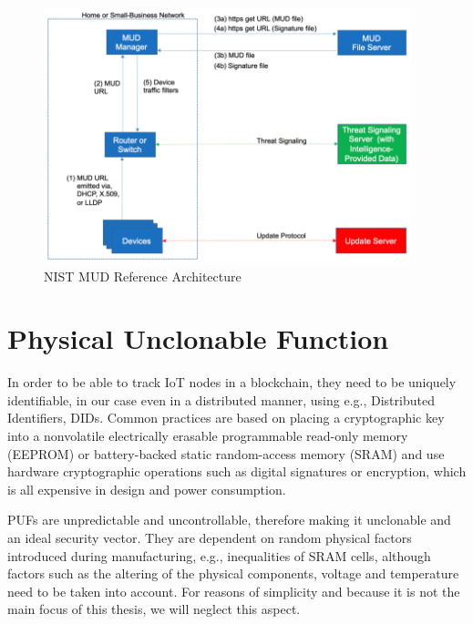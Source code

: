 \begin{figure}
	\begin{center}
		\includegraphics[width=0.95\textwidth]{figures/nist-mud-arch.png}
	\end{center}
	\caption{NIST MUD Reference Architecture}
	\label{fig:NIST MUD Reference Architecture}
\end{figure}

\section{Physical Unclonable Function} %
\label{sec:Physical Unclonable Function}

In order to be able to track IoT nodes in a blockchain, they need to be uniquely identifiable, in our case even in a
distributed manner, using e.g., Distributed Identifiers, DIDs.
Common practices are based on placing a cryptographic key into a nonvolatile electrically erasable programmable
read-only memory (EEPROM) or battery-backed static random-access memory (SRAM) and use hardware cryptographic operations
such as digital signatures or encryption, which is all expensive in design and power consumption. \cite{herder2014physical}

PUFs are unpredictable and uncontrollable, therefore making it unclonable and an ideal security vector. They are
dependent on random physical factors introduced during manufacturing, e.g., inequalities of SRAM cells, although factors
such as the altering of the physical components, voltage and temperature need to be taken into account. \cite{vinagrero2023sram}
For reasons of simplicity and because it is not the main focus of this thesis, we will neglect this aspect.

